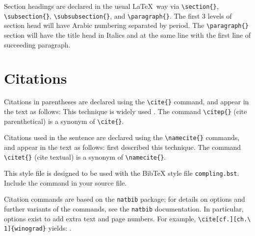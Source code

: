 \documentclass{clv3}
\begin{document}
Section headings are declared in the usual \LaTeX\ way via \verb|\section{}|,
\verb|\subsection{}|, \verb|\subsubsection{}|, and \verb|\paragraph{}|. The
first 3 levels of section head will have Arabic numbering separated
by period. The \verb|\paragraph{}| section will have the title head in Italics
and at the same line with the first line of succeeding paragraph.

\section{Citations}
Citations in parentheses are declared using the \verb|\cite{}|
command, and appear in the text as follows:
This technique is widely used \cite{woods}.
The command \verb|\citep{}| (cite parenthetical) is a synonym of \verb|\cite{}|.

Citations used in the sentence are declared using the \verb|\namecite{}|
commands, and appear in the text as follows:
 first described this technique.
The command \verb|\citet{}| (cite textual) is a synonym of \verb|\namecite{}|.

This style file is designed to be used with the BibTeX
style file \verb|compling.bst|.  Include the command
\verb|| in your source file.

Citation commands are based on the \verb|natbib| package;
for details on options and further variants of the commands,
see the \verb|natbib| documentation.  In particular, options
exist to add extra text and page numbers.  For example,
\verb|\cite[cf.][ch.\ 1]{winograd}| yields: \cite[cf.][ch.\ 1]{winograd}.
\end{document}
